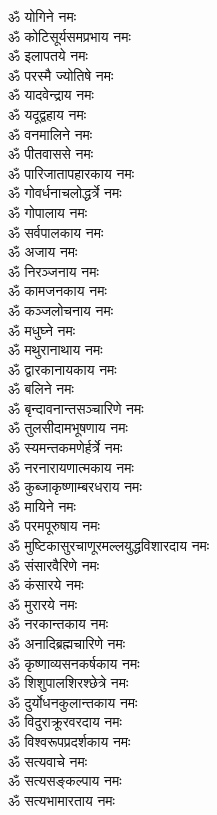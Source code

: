 \begin{center}
\begin{multicols}{2}
\begin{flushleft}
ॐ योगिने नमः\\
ॐ कोटिसूर्यसमप्रभाय नमः\hfill{}\\
ॐ इलापतये नमः\\
ॐ परस्मै ज्योतिषे नमः\\
ॐ यादवेन्द्राय नमः\\
ॐ यदूद्वहाय नमः\\
ॐ वनमालिने नमः\\
ॐ पीतवाससे नमः\\
ॐ पारिजातापहारकाय नमः\\
ॐ गोवर्धनाचलोद्धर्त्रे नमः\\
ॐ गोपालाय नमः\\
ॐ सर्वपालकाय नमः\hfill{}\\
ॐ अजाय नमः\\
ॐ निरञ्जनाय नमः\\
ॐ कामजनकाय नमः\\
ॐ कञ्जलोचनाय नमः\\
ॐ मधुघ्ने नमः\\
ॐ मथुरानाथाय नमः\\
ॐ द्वारकानायकाय नमः\\
ॐ बलिने नमः\\
ॐ बृन्दावनान्तसञ्चारिणे नमः\\
ॐ तुलसीदामभूषणाय नमः\hfill{}\\
ॐ स्यमन्तकमणेर्हर्त्रे नमः\\
ॐ नरनारायणात्मकाय नमः\\
ॐ कुब्जाकृष्णाम्बरधराय नमः\\
ॐ मायिने नमः\\
ॐ परमपूरुषाय नमः\\
ॐ मुष्टिकासुरचाणूर\-मल्लयुद्ध\-विशारदाय नमः\\
ॐ संसारवैरिणे नमः\\
ॐ कंसारये नमः\\
ॐ मुरारये नमः\\
ॐ नरकान्तकाय नमः\hfill{}\\
ॐ अनादिब्रह्मचारिणे नमः\\
ॐ कृष्णाव्यसनकर्षकाय नमः\\
ॐ शिशुपालशिरश्छेत्रे नमः\\
ॐ दुर्योधनकुलान्तकाय नमः\\
ॐ विदुराक्रूरवरदाय नमः\\
ॐ विश्वरूपप्रदर्शकाय नमः\\
ॐ सत्यवाचे नमः\\
ॐ सत्यसङ्कल्पाय नमः\\
ॐ सत्यभामारताय नमः\\

\end{flushleft}
\end{multicols}
\end{center}
